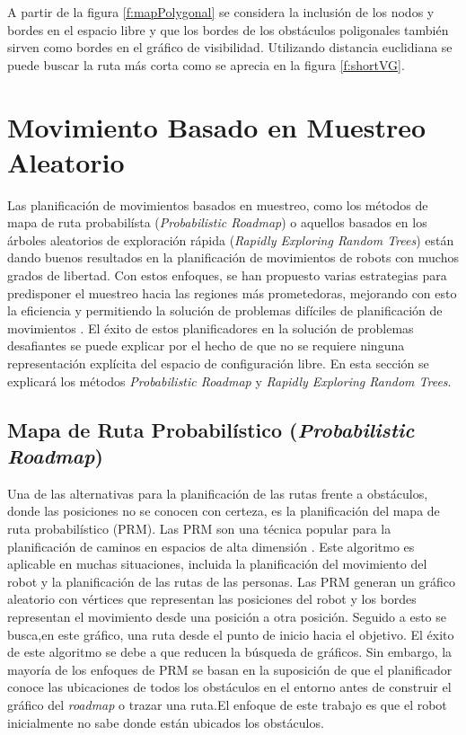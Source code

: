 A partir de la figura \ref{f:mapPolygonal} se considera la inclusi\'on de los nodos y bordes en el espacio libre y que los bordes de los obst\'aculos poligonales tambi\'en sirven como bordes en el gr\'afico de visibilidad. Utilizando distancia euclidiana se puede buscar la ruta m\'as corta como se aprecia en la figura \ref{f:shortVG}.

\section{Movimiento Basado en Muestreo Aleatorio}

Las planificaci\'on de movimientos basados en muestreo, como los m\'etodos de mapa de ruta probabil\'ista (\textit{Probabilistic Roadmap}) o aquellos basados en los \'arboles aleatorios de exploraci\'on r\'apida (\textit{Rapidly Exploring Random Trees}) est\'an dando buenos resultados en la planificaci\'on de movimientos de robots con muchos grados de libertad. Con estos enfoques, se han propuesto varias estrategias para predisponer el muestreo hacia las regiones m\'as prometedoras, mejorando con esto la eficiencia y permitiendo la soluci\'on de problemas dif\'iciles de planificaci\'on de movimientos \cite{elbanhawi2014sampling}. El \'exito de estos planificadores en la soluci\'on de problemas desafiantes se puede explicar por el hecho de que no se requiere ninguna representaci\'on expl\'icita del espacio de configuraci\'on libre. En esta secci\'on se explicar\'a los m\'etodos \textit{Probabilistic Roadmap} y \textit{Rapidly Exploring Random Trees}.

\subsection{Mapa de Ruta Probabil\'istico (\textit{Probabilistic Roadmap})}

Una de las alternativas para la planificaci\'on de las rutas frente a obst\'aculos, donde las posiciones no se conocen con certeza, es la planificaci\'on del mapa de ruta probabil\'istico (PRM). Las PRM son una t\'ecnica popular para la planificaci\'on de caminos en espacios de alta dimensi\'on \cite{guibas1999probabilistic}. Este algoritmo es aplicable en muchas situaciones, incluida la planificaci\'on del movimiento del robot y la planificaci\'on de las rutas de las personas. Las PRM generan un gr\'afico aleatorio con v\'ertices que representan las posiciones del robot y los bordes representan el movimiento desde una posici\'on a otra posici\'on. Seguido a esto se busca,en este gr\'afico, una ruta desde el punto de inicio hacia el objetivo. El \'exito de este algoritmo se debe a que reducen la b\'usqueda de gr\'aficos. Sin embargo, la mayor\'ia de los enfoques de PRM se basan en la suposici\'on de que el planificador conoce las ubicaciones de todos los obst\'aculos en el entorno antes de construir el gr\'afico del \textit{roadmap} o trazar una ruta.El enfoque de este trabajo es que el robot inicialmente no sabe donde est\'an ubicados los obst\'aculos.

